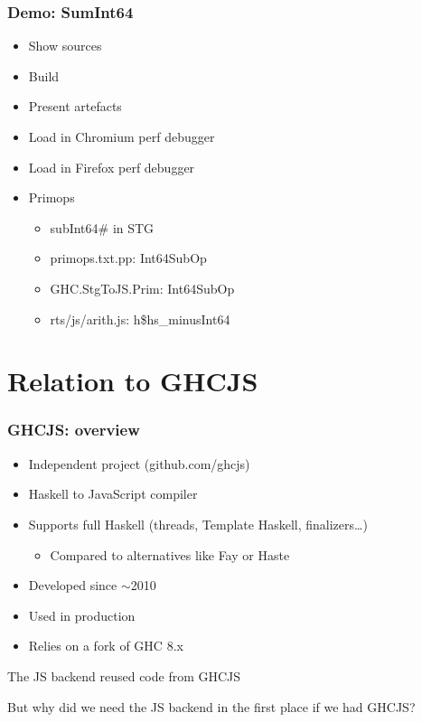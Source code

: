 \documentclass{beamer}
\begin{document}
\begin{frame}
\frametitle{Demo: SumInt64}
\begin{itemize}
\item Show sources
\item Build
\item Present artefacts
\item Load in Chromium perf debugger
\item Load in Firefox perf debugger
\item Primops
  \begin{itemize}
    \item subInt64\# in STG
    \item primops.txt.pp: Int64SubOp
    \item GHC.StgToJS.Prim: Int64SubOp
    \item rts/js/arith.js: h\$hs\_minusInt64
  \end{itemize}
\end{itemize}
\end{frame}

\section{Relation to GHCJS}

\begin{frame}
\frametitle{GHCJS: overview}
\begin{itemize}
\item Independent project (github.com/ghcjs)
\item Haskell to JavaScript compiler
\item Supports full Haskell (threads, Template Haskell, finalizers…)
\begin{itemize}
\item Compared to alternatives like Fay or Haste
\end{itemize}
\item Developed since $\sim$2010
\item Used in production
\item Relies on a fork of GHC 8.x
\end{itemize}
\begin{center}
\alert{The JS backend reused code from GHCJS}
\end{center}
But why did we need the JS backend in the first place if we had GHCJS?
\end{frame}
\end{document}
